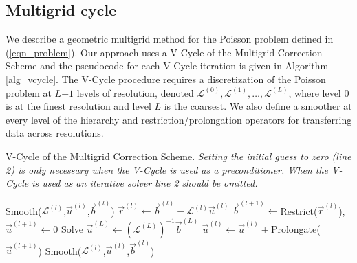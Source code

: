 \subsection{Multigrid cycle}
\label{sec_cycle}
We describe a geometric multigrid method for the Poisson problem defined in (\ref{eqn_problem}). Our approach uses a V-Cycle of the Multigrid Correction Scheme
\cite{trottenberg:2001:multigrid} and the pseudocode for each V-Cycle iteration is given in Algorithm \ref{alg_vcycle}. The V-Cycle procedure requires a discretization of the Poisson
problem at $L$$+$$1$ levels of resolution, denoted $\mathcal{L}^{(0)},\mathcal{L}^{(1)},\ldots,\mathcal{L}^{(L)}$, where level $0$ is at the finest resolution and level $L$ is the
coarsest. We also define a smoother at every level of the hierarchy and restriction/prolongation operators for transferring data across resolutions.

\begin{algorithm}[h]
\caption{V-Cycle of the Multigrid Correction Scheme.
\textit{Setting the initial guess to zero (line 2) is only necessary when the V-Cycle is used as a preconditioner. When the
  V-Cycle is used as an iterative solver line 2 should be omitted.}}
\label{alg_vcycle}
\begin{algorithmic}[1]
\State Smooth($\mathcal{L}^{(l)}$,$\vec{u}^{(l)}$,$\vec{b}^{(l)}$)
\State $\vec{r}^{(l)}\gets\vec{b}^{(l)}-\mathcal{L}^{(l)}\vec{u}^{(l)}$
\State $\vec{b}^{(l+1)}\gets$Restrict($\vec{r}^{(l)}$),\ $\vec{u}^{(l+1)}\gets 0$
\EndFor
\State Solve $\vec{u}^{(L)}\gets (\mathcal{L}^{(L)})^{-1}\vec{b}^{(L)}$
\State $\vec{u}^{(l)}\gets \vec{u}^{(l)}+$Prolongate($\vec{u}^{(l+1)}$)
\State Smooth($\mathcal{L}^{(l)}$,$\vec{u}^{(l)}$,$\vec{b}^{(l)}$)
\EndFor
\EndProcedure
\end{algorithmic}
\end{algorithm}

